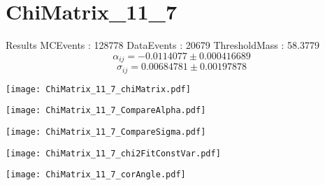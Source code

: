 \documentclass[a4paper,12pt]{article}
\begin{document}
\section{ChiMatrix\_11\_7}
\begin{minipage}{0.49\linewidth} Results \newline
MCEvents : 128778\newline
DataEvents : 20679 \newline
ThresholdMass : 58.3779\\
$$\alpha_{ij} = -0.0114077\pm 0.000416689$$
$$\sigma_{ij} = 0.00684781\pm 0.00197878$$
\end{minipage}\hfill
\begin{minipage}{0.49\linewidth} 
\texttt{[image: ChiMatrix\_11\_7\_chiMatrix.pdf]}\\
\end{minipage}
\hfill
\begin{minipage}{0.49\linewidth} 
\texttt{[image: ChiMatrix\_11\_7\_CompareAlpha.pdf]}\\
\end{minipage}
\hfill
\begin{minipage}{0.49\linewidth} 
\texttt{[image: ChiMatrix\_11\_7\_CompareSigma.pdf]}\\
\end{minipage}
\begin{minipage}{0.49\linewidth} 
\texttt{[image: ChiMatrix\_11\_7\_chi2FitConstVar.pdf]}\\
\end{minipage}
\hfill
\begin{minipage}{0.49\linewidth} 
\texttt{[image: ChiMatrix\_11\_7\_corAngle.pdf]}\\
\end{minipage}
\end{document}
